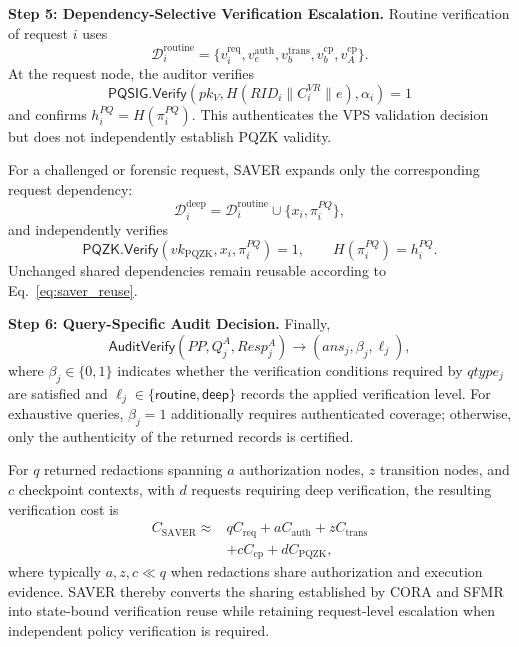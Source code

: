 \documentclass[lettersize,journal]{IEEEtran}
\begin{document}
\medskip
\noindent\textbf{Step 5: Dependency-Selective Verification Escalation.}
Routine verification of request $i$ uses
\begin{equation}
\mathcal{D}_i^{\mathrm{routine}}
=
\{
v_i^{\mathrm{req}},
v_e^{\mathrm{auth}},
v_b^{\mathrm{trans}},
v_b^{\mathrm{cp}},
v_A^{\mathrm{cp}}
\}.
\end{equation}
At the request node, the auditor verifies
\begin{equation}
\mathsf{PQSIG.Verify}
\left(
pk_V,
H(RID_i\parallel C_i^{VR}\parallel e),
\alpha_i
\right)=1
\end{equation}
and confirms $h_i^{PQ}=H(\pi_i^{PQ})$. This authenticates the VPS
validation decision but does not independently establish PQZK validity.

For a challenged or forensic request, SAVER expands only the
corresponding request dependency:
\begin{equation}
\mathcal{D}_i^{\mathrm{deep}}
=
\mathcal{D}_i^{\mathrm{routine}}
\cup
\{x_i,\pi_i^{PQ}\},
\end{equation}
and independently verifies
\begin{equation}
\mathsf{PQZK.Verify}
(vk_{\mathrm{PQZK}},x_i,\pi_i^{PQ})=1,
\qquad
H(\pi_i^{PQ})=h_i^{PQ}.
\end{equation}
Unchanged shared dependencies remain reusable according to
Eq.~\eqref{eq:saver_reuse}.

\medskip
\noindent\textbf{Step 6: Query-Specific Audit Decision.}
Finally,
\begin{equation}
\mathsf{AuditVerify}
(PP,Q_j^A,Resp_j^A)
\rightarrow
(ans_j,\beta_j,\ell_j),
\end{equation}
where $\beta_j\in\{0,1\}$ indicates whether the verification conditions
required by $qtype_j$ are satisfied and
$\ell_j\in\{\mathsf{routine},\mathsf{deep}\}$ records the applied
verification level. For exhaustive queries, $\beta_j=1$ additionally
requires authenticated coverage; otherwise, only the authenticity of
the returned records is certified.

For $q$ returned redactions spanning $a$ authorization nodes, $z$
transition nodes, and $c$ checkpoint contexts, with $d$ requests
requiring deep verification, the resulting verification cost is
\begin{equation}
\begin{aligned}
C_{\mathrm{SAVER}}
\approx{}&
qC_{\mathrm{req}}
+aC_{\mathrm{auth}}
+zC_{\mathrm{trans}}\\
&+cC_{\mathrm{cp}}
+dC_{\mathrm{PQZK}},
\end{aligned}
\end{equation}
where typically $a,z,c\ll q$ when redactions share authorization and
execution evidence. SAVER thereby converts the sharing established by
CORA and SFMR into state-bound verification reuse while retaining
request-level escalation when independent policy verification is
required.
\end{document}
